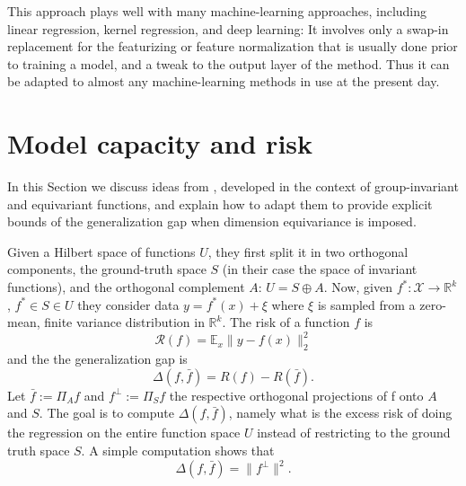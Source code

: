 \documentclass[nohyperref]{article}
\theoremstyle{plain}
\theoremstyle{definition}
\theoremstyle{remark}
\begin{document}
This approach plays well with many machine-learning approaches, including linear regression, kernel regression, and deep learning:
It involves only a swap-in replacement for the featurizing or feature normalization that is usually done prior to training a model, and a tweak to the output layer of the method.
Thus it can be adapted to almost any machine-learning methods in use at the present day.

\section{Model capacity and risk} \label{sec:analysis}

In this Section we discuss ideas from \citealt{elesedy2021provably}, developed in the context of group-invariant and equivariant functions, and explain how to adapt them to provide explicit bounds of the generalization gap when dimension equivariance is imposed.

Given a Hilbert space of functions $U$, they first split it in two orthogonal components, the ground-truth space $S$ (in their case the space of invariant functions), and the orthogonal complement $A$: $U= S\oplus A$. Now, given $f^*:\mathcal X \to \mathbb R^k$, $f^*\in S \in U$ they consider data $y=f^*(x)+\xi$ where $\xi$ is sampled from a zero-mean, finite variance distribution in $\mathbb R^k$. The risk of a function $f$ is
\begin{equation}
    \mathcal R(f) = \mathbb E_x \|y - f(x)\|_2^2
\end{equation}
and the the generalization gap is
\begin{equation}
    \Delta(f, \bar f)= R(f)-R(\bar f). 
\end{equation}
Let $\bar f:=\Pi_{A}f$ and $f^\perp:=\Pi_{S}f$ the respective orthogonal projections of f onto $A$ and $S$. The goal is to compute $\Delta(f, \bar f)$, namely what is the excess risk of doing the regression on the entire function space $U$ instead of restricting to the ground truth space $S$. A simple computation shows that 
\begin{equation}
    \Delta(f, \bar f) = \|f^\perp\|^2.
\end{equation}
\end{document}
